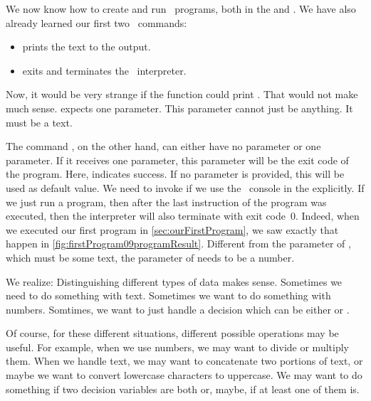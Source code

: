 %
%
We now know how to create and run \python\ programs, both in the  and .
We have also already learned our first two \python\ commands:%
%
\begin{itemize}%
\item {} prints the text  to the output.
\item {} exits and terminates the \python\ interpreter.%
\end{itemize}%
%
Now, it would be very strange if the  function could print .
That would not make much sense.
 expects one parameter.
This parameter cannot just be anything.
It must be a text.

The command , on the other hand, can either have no parameter or one parameter.
If it receives one parameter, this parameter will be the exit code of the program.
Here,  indicates success.
If no parameter is provided, this will be used as default value.
We need to invoke  if we use the \python\ console in the  explicitly.
If we just run a program, then after the last instruction of the program was executed, then the interpreter will also terminate with exit code~0.
Indeed, when we executed our first program in \cref{sec:ourFirstProgram}, we saw exactly that happen in \cref{fig:firstProgram09programResult}.
Different from the parameter of , which must be some text, the parameter of  needs to be a number.

We realize:
Distinguishing different types of data makes sense.
Sometimes we need to do something with text.
Sometimes we want to do something with numbers.
Somtimes, we want to just handle a decision which can be either  or .

Of course, for these different situations, different possible operations may be useful.
For example, when we use numbers, we may want to divide or multiply them.
When we handle text, we may want to concatenate two portions of text, or maybe we want to convert lowercase characters to uppercase.
We may want to do something if two decision variables are both  or, maybe, if at least one of them is.

